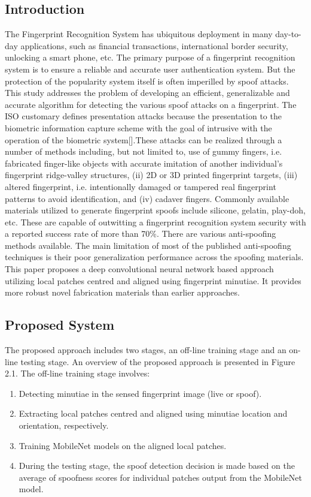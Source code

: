 \subsection{Introduction}
The Fingerprint Recognition System has ubiquitous deployment in many day-to-day applications, such as financial transactions, international border security, unlocking a smart phone, etc. The primary purpose of a fingerprint recognition system is to ensure a reliable and accurate user authentication system. But the protection of the popularity system itself is often imperilled by spoof attacks. This study addresses the problem of developing an efficient, generalizable and accurate algorithm for detecting the various spoof attacks on a fingerprint. The ISO customary defines presentation attacks because the presentation to the biometric information capture scheme with the goal of intrusive with the operation of the biometric system[].These attacks can be realized through a number of methods including, but not limited to, use of gummy fingers, i.e. fabricated finger-like objects with accurate imitation of another individual's fingerprint ridge-valley structures, (ii) 2D or 3D printed fingerprint targets, (iii) altered fingerprint, i.e. intentionally  damaged or tampered real fingerprint patterns to avoid identification, and (iv) cadaver fingers. Commonly available materials utilized to generate fingerprint spoofs include silicone, gelatin,  play-doh, etc. These are capable of outwitting a fingerprint recognition system security with a reported success rate of more than 70\%. There are various anti-spoofing methods available. The main limitation of most of the published anti-spoofing techniques is their poor generalization performance across the spoofing materials. This paper proposes a deep convolutional neural network based approach utilizing local patches centred and aligned using fingerprint minutiae. It provides more robust novel fabrication materials than earlier approaches.  
\subsection{Proposed System}
The proposed approach includes two stages, an off-line training stage and an on-line testing stage. An overview of the proposed approach is presented in Figure 2.1. The off-line training stage involves:
\begin{enumerate}
\item Detecting minutiae in the sensed fingerprint image (live or spoof). 
\item Extracting local patches centred and aligned using minutiae location and orientation, respectively.
\item Training MobileNet models on the aligned local patches. 
\item During the testing stage, the spoof detection decision is made based on the average of spoofness scores for individual patches output from the MobileNet model. 
\end{enumerate}

